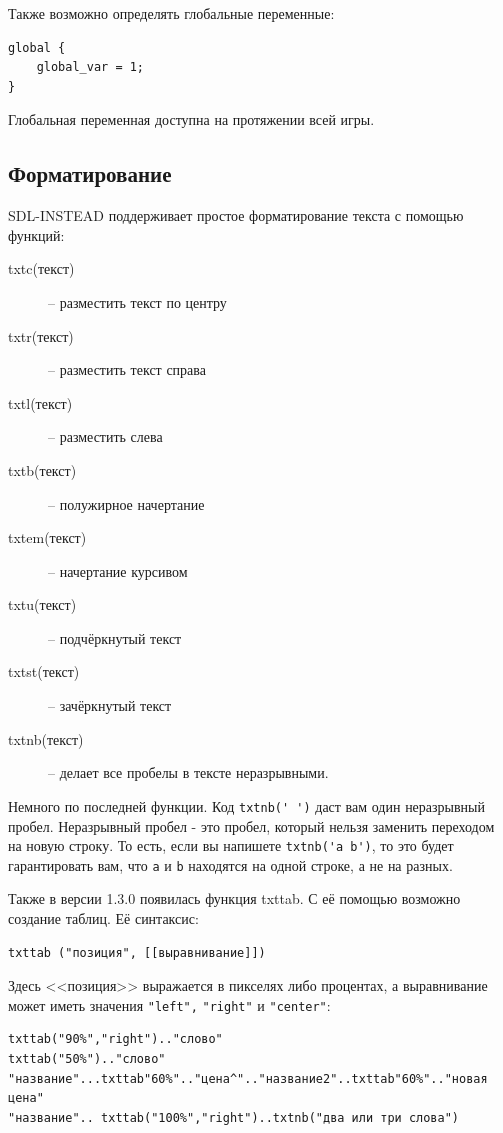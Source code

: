 \documentclass[12pt]{article}
\begin{document}
Также возможно определять глобальные переменные:
\begin{verbatim}
global {
    global_var = 1;
}
\end{verbatim}
Глобальная переменная доступна на протяжении всей игры.

\subsection{Форматирование}
SDL-INSTEAD поддерживает простое форматирование текста с помощью функций:

\begin{description}
\item[txtc(текст)]  -- разместить текст по центру
\item[txtr(текст)]  -- разместить текст справа
\item[txtl(текст)]  -- разместить слева
\item[txtb(текст)]  -- полужирное начертание
\item[txtem(текст)]  -- начертание курсивом
\item[txtu(текст)]  -- подчёркнутый текст
\item[txtst(текст)]  -- зачёркнутый текст
\item[txtnb(текст)]  -- делает все пробелы в тексте неразрывными.
\end{description}

Немного по последней функции. Код \verb/txtnb(' ')/ даст вам один неразрывный пробел. Неразрывный пробел - это пробел, который нельзя заменить переходом на новую строку. То есть, если вы напишете \verb/txtnb('a b')/, то это будет гарантировать вам, что \verb/a/ и \verb/b/ находятся на одной строке, а не на разных.

Также в версии 1.3.0 появилась функция txttab. С её помощью возможно создание таблиц. Её синтаксис:

\begin{verbatim}
txttab ("позиция", [[выравнивание]])
\end{verbatim}

Здесь <<позиция>> выражается в пикселях либо процентах, а выравнивание может иметь значения \verb/"left",/ \linebreak \verb/"right"/ и \verb/"center"/:

\begin{verbatim}
txttab("90%","right").."слово"
txttab("50%").."слово"
"название"...txttab"60%".."цена^".."название2"..txttab"60%".."новая цена"
"название".. txttab("100%","right")..txtnb("два или три слова")
\end{verbatim}
\end{document}
